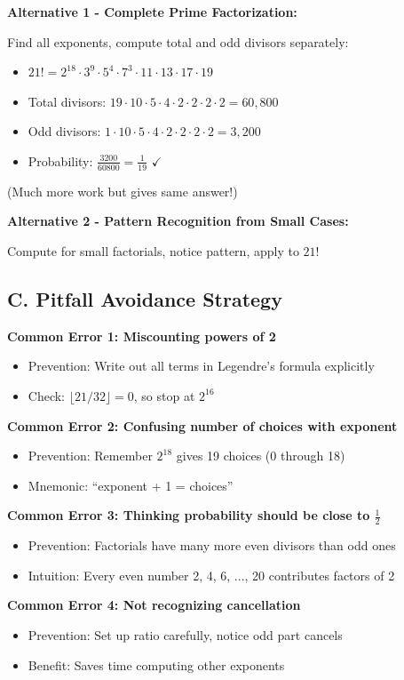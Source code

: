 \documentclass[]{article}
\begin{document}
\begin{solutionbox}
\textbf{Alternative 1 - Complete Prime Factorization:}

Find all exponents, compute total and odd divisors separately:
\begin{itemize}[leftmargin=*]
    \item $21! = 2^{18} \cdot 3^9 \cdot 5^4 \cdot 7^3 \cdot 11 \cdot 13 \cdot 17 \cdot 19$
    \item Total divisors: $19 \cdot 10 \cdot 5 \cdot 4 \cdot 2 \cdot 2 \cdot 2 \cdot 2 = 60,800$
    \item Odd divisors: $1 \cdot 10 \cdot 5 \cdot 4 \cdot 2 \cdot 2 \cdot 2 \cdot 2 = 3,200$
    \item Probability: $\frac{3200}{60800} = \frac{1}{19}$ $\checkmark$
\end{itemize}

(Much more work but gives same answer!)

\textbf{Alternative 2 - Pattern Recognition from Small Cases:}

Compute for small factorials, notice pattern, apply to $21!$

\subsection*{C. Pitfall Avoidance Strategy}

\textbf{Common Error 1: Miscounting powers of 2}
\begin{itemize}[leftmargin=*]
    \item Prevention: Write out all terms in Legendre's formula explicitly
    \item Check: $\lfloor 21/32 \rfloor = 0$, so stop at $2^{16}$
\end{itemize}

\textbf{Common Error 2: Confusing number of choices with exponent}
\begin{itemize}[leftmargin=*]
    \item Prevention: Remember $2^{18}$ gives 19 choices (0 through 18)
    \item Mnemonic: ``exponent + 1 = choices''
\end{itemize}

\textbf{Common Error 3: Thinking probability should be close to $\frac{1}{2}$}
\begin{itemize}[leftmargin=*]
    \item Prevention: Factorials have many more even divisors than odd ones
    \item Intuition: Every even number 2, 4, 6, ..., 20 contributes factors of 2
\end{itemize}

\textbf{Common Error 4: Not recognizing cancellation}
\begin{itemize}[leftmargin=*]
    \item Prevention: Set up ratio carefully, notice odd part cancels
    \item Benefit: Saves time computing other exponents
\end{itemize}
\end{solutionbox}
\end{document}
